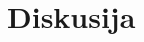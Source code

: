 \documentclass{article}
\begin{document}







\section{Diskusija}
\label{sec:discussion}

\end{document}
